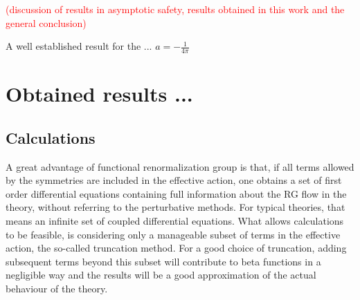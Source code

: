 \documentclass[11pt, a4paper]{article}
\begin{document}
\textcolor{red}{(discussion of results in asymptotic safety, results obtained in this work and the general conclusion)} 

A well established result for the ... $a = - \frac{1}{4 \pi}$

\section{Obtained results ...}

\subsection{Calculations}

A great advantage of functional renormalization group is that, if all terms
allowed by the symmetries are included in the effective action, one obtains a set of first order
differential equations containing full information about the RG flow in the theory, without referring to the perturbative methods.
For typical theories, that means an infinite set of coupled differential equations.
What allows calculations to be feasible, is considering only a manageable subset of terms in the effective action, the so-called truncation method.
For a good choice of truncation, adding subsequent terms beyond this subset will contribute to beta functions in a negligible way
and the results will be a good approximation of the actual behaviour of the theory.
\end{document}
